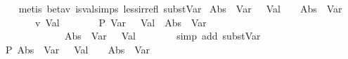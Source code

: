 \begin{isabellebody}
%
\isadelimproof
\ \ %
\endisadelimproof
%
\isatagproof
{}\isamarkupfalse%
\ {\isacharparenleft}{\kern0pt}metis\ beta{\isacharunderscore}{\kern0pt}v\ is{\isacharunderscore}{\kern0pt}val{\isachardot}{\kern0pt}simps\ less{\isacharunderscore}{\kern0pt}irrefl\ subst{\isacharunderscore}{\kern0pt}Var{\isacharparenright}{\kern0pt}%
\endisatagproof
{\isafoldproof}%
%
\isadelimproof
\isanewline
%
\endisadelimproof
\isanewline
\isanewline
{}\isamarkupfalse%
\ {\isachardoublequoteopen}{\isacharparenleft}{\kern0pt}Abs\ {\isasymtau}{}\ {\isacharparenleft}{\kern0pt}Var\ {}\ {\isasymcdot}\ Val\ {}\ {}{\isacharparenright}{\kern0pt}{\isacharparenright}{\kern0pt}\ {\isasymcdot}\ {\isacharparenleft}{\kern0pt}Abs\ {\isasymtau}{}\ {\isacharparenleft}{\kern0pt}Var\ {}{\isacharparenright}{\kern0pt}{\isacharparenright}{\kern0pt}\isanewline
\ \ \ \ \ \ \ {\isasymrightarrow}\isactrlsub v\isactrlsup {\isacharasterisk}{\kern0pt}\ Val\ {}\ {}{\isachardoublequoteclose}\isanewline
%
\isadelimproof
%
\endisadelimproof
%
\isatagproof
{}\isamarkupfalse%
\ {\isacharminus}{\kern0pt}\isanewline
\ \ \isamarkupfalse%
\ P{}{\isacharcolon}{\kern0pt}\ {\isachardoublequoteopen}{\isacharparenleft}{\kern0pt}Var\ {}\ {\isasymcdot}\ Val\ {}\ {}{\isacharparenright}{\kern0pt}{\isacharbrackleft}{\kern0pt}{\isacharparenleft}{\kern0pt}Abs\ {\isasymtau}{}\ {\isacharparenleft}{\kern0pt}Var\ {}{\isacharparenright}{\kern0pt}{\isacharparenright}{\kern0pt}{\isacharslash}{\kern0pt}{}{\isacharbrackright}{\kern0pt}\isanewline
\ \ \ \ \ \ \ \ \ \ \ \ {\isacharequal}{\kern0pt}\ {\isacharparenleft}{\kern0pt}{\isacharparenleft}{\kern0pt}Abs\ {\isasymtau}{}\ {\isacharparenleft}{\kern0pt}Var\ {}{\isacharparenright}{\kern0pt}{\isacharparenright}{\kern0pt}\ {\isasymcdot}\ Val\ {}\ {}{\isacharparenright}{\kern0pt}{\isachardoublequoteclose}\isanewline
\ \ \ \ \isamarkupfalse%
\ {\isacharparenleft}{\kern0pt}simp\ add{\isacharcolon}{\kern0pt}\ subst{\isacharunderscore}{\kern0pt}Var{\isacharparenright}{\kern0pt}\isanewline
\isanewline
\ \ \isamarkupfalse%
\ P{}{\isacharcolon}{\kern0pt}\ {\isachardoublequoteopen}{\isacharparenleft}{\kern0pt}Abs\ {\isasymtau}{}\ {\isacharparenleft}{\kern0pt}Var\ {}\ {\isasymcdot}\ Val\ {}\ {}{\isacharparenright}{\kern0pt}{\isacharparenright}{\kern0pt}\ {\isasymcdot}\ {\isacharparenleft}{\kern0pt}Abs\ {\isasymtau}{}\ {\isacharparenleft}{\kern0pt}Var\ {}{\isacharparenright}{\kern0pt}{\isacharparenright}{\kern0pt}\isanewline

\end{isabellebody}

